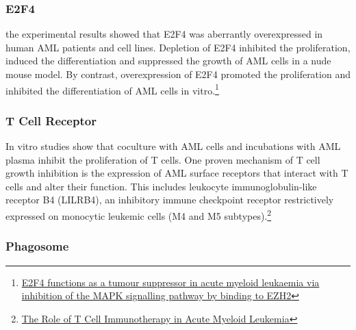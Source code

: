 \documentclass[11pt]{article}
\begin{document}
    \hypertarget{e2f4}{%
\subsubsection{E2F4}\label{e2f4}}

the experimental results showed that E2F4 was aberrantly overexpressed
in human AML patients and cell lines. Depletion of E2F4 inhibited the
proliferation, induced the differentiation and suppressed the growth of
AML cells in a nude mouse model. By contrast, overexpression of E2F4
promoted the proliferation and inhibited the differentiation of AML
cells in vitro.\footnote{\href{https://pubmed.ncbi.nlm.nih.gov/31943751/}{E2F4
  functions as a tumour suppressor in acute myeloid leukaemia via
  inhibition of the MAPK signalling pathway by binding to EZH2}}

    \hypertarget{t-cell-receptor}{%
\subsubsection{T Cell Receptor}\label{t-cell-receptor}}

In vitro studies show that coculture with AML cells and incubations with
AML plasma inhibit the proliferation of T cells. One proven mechanism of
T cell growth inhibition is the expression of AML surface receptors that
interact with T cells and alter their function. This includes leukocyte
immunoglobulin-like receptor B4 (LILRB4), an inhibitory immune
checkpoint receptor restrictively expressed on monocytic leukemic cells
(M4 and M5 subtypes).\footnote{\href{https://www.ncbi.nlm.nih.gov/pmc/articles/PMC8699747/}{The
  Role of T Cell Immunotherapy in Acute Myeloid Leukemia}}

    \hypertarget{phagosome}{%
\subsubsection{Phagosome}\label{phagosome}}
\end{document}
